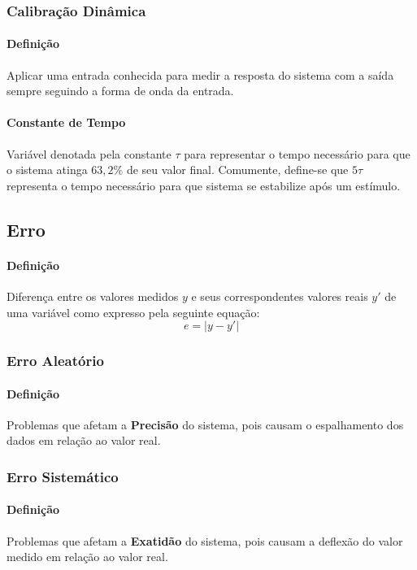 \documentclass{article}
\begin{document}
        \subsubsection{Calibração Dinâmica}
            \paragraph{Definição}Aplicar uma entrada conhecida para medir a resposta do sistema com a saída sempre seguindo a forma de onda da entrada.

            \paragraph{Constante de Tempo}Variável denotada pela constante $\tau$ para representar o tempo necessário para que o sistema atinga $63,2\%$ de seu valor final. Comumente, define-se que $5\tau$ representa o tempo necessário para que sistema se estabilize após um estímulo.

    \subsection{Erro}
        \paragraph{Definição}Diferença entre os valores medidos $y$ e seus correspondentes valores reais $y'$ de uma variável como expresso pela seguinte equação:
            \begin{equation}
                \boxed{
                    e = |y - y'|
                }
            \end{equation}

        \subsubsection{Erro Aleatório}
            \paragraph{Definição}Problemas que afetam a \textbf{Precisão} do sistema, pois causam o espalhamento dos dados em relação ao valor real.

        \subsubsection{Erro Sistemático}
            \paragraph{Definição}Problemas que afetam a \textbf{Exatidão} do sistema, pois causam a deflexão do valor medido em relação ao valor real.
\end{document}
